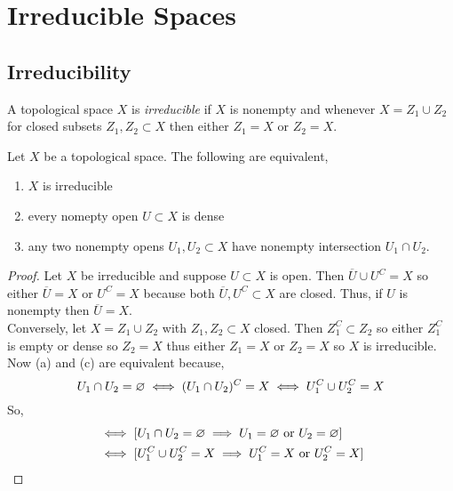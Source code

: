 \documentclass[12pt]{article}
\begin{document}
\tableofcontents

\section{Irreducible Spaces}

\subsection{Irreducibility}

\begin{defn}
A topological space $X$ is \textit{irreducible} if $X$ is nonempty and whenever $X = Z_1 \cup Z_2$ for closed subsets $Z_1, Z_2 \subset X$ then either $Z_1 = X$ or $Z_2 = X$.
\end{defn}

\begin{lemma}
Let $X$ be a topological space. The following are equivalent,
\begin{enumerate}
\item $X$ is irreducible
\item every nomepty open $U \subset X$ is dense
\item any two nonempty opens $U_1, U_2 \subset X$ have nonempty intersection $U_1 \cap U_2$.
\end{enumerate}
\end{lemma}

\begin{proof}
Let $X$ be irreducible and suppose $U \subset X$ is open. Then $\overline{U} \cup U^C = X$ so either $\overline{U} = X$ or $U^C = X$ because both $\overline{U}, U^C \subset X$ are closed. Thus, if $U$ is nonempty then $\overline{U} = X$.
\bigskip\\
Conversely, let $X = Z_1 \cup Z_2$ with $Z_1, Z_2 \subset X$ closed. Then $Z_1^C \subset Z_2$ so either $Z_1^C$ is empty or dense so $Z_2 = X$ thus either $Z_1 = X$ or $Z_2 = X$ so $X$ is irreducible. 
\bigskip\\
Now (a) and (c) are equivalent because,
\[ U_1 \cap U_2 = \varnothing \iff (U_1 \cap U_2)^C = X \iff U_1^C \cup U_2^C = X \]
So,
\begin{align*}
[U_1, U_2 \neq \empty \implies U_1 \cap U_2 \neq \empty] & \iff [U_1 \cap U_2 = \empty \implies U_1 = \empty \text{ or } U_2 = \empty]
\\
& \iff [U_1^C \cup U_2^C = X \implies U_1^C = X \text{ or } U_2^C = X]
\end{align*}
\end{proof}
\end{document}
